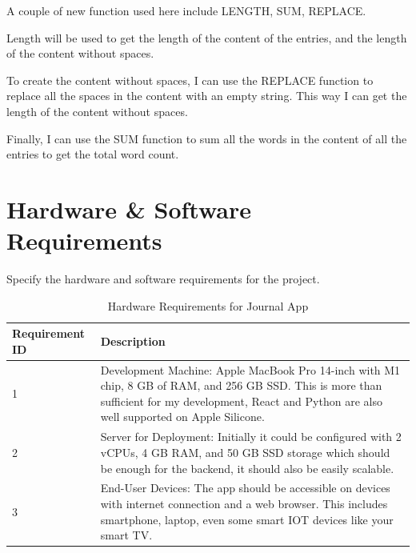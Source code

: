 A couple of new function used here include LENGTH, SUM, REPLACE.

Length will be used to get the length of the content of the entries, and the length of the content without spaces.

To create the content without spaces, I can use the REPLACE function to replace all the spaces in the content with an empty string. This way I can get the length of the content without spaces.

Finally, I can use the SUM function to sum all the words in the content of all the entries to get the total word count.








\section{Hardware \& Software Requirements}
Specify the hardware and software requirements for the project.

\begin{table}[H]
    \centering
    \begin{tabular}{|l|p{10cm}|}
    \hline
    \textbf{Requirement ID} & \textbf{Description} \\ \hline
    1 & Development Machine: Apple MacBook Pro 14-inch with M1 chip, 8 GB of RAM, and 256 GB SSD. This is more than sufficient for my development, React and Python are also well supported on Apple Silicone. \\ \hline
    2 & Server for Deployment: Initially it could be configured with 2 vCPUs, 4 GB RAM, and 50 GB SSD storage which should be enough for the backend, it should also be easily scalable. \\ \hline
    3 & End-User Devices: The app should be accessible on devices with internet connection and a web browser. This includes smartphone, laptop, even some smart IOT devices like your smart TV. \\ \hline
    \end{tabular}
    \caption{Hardware Requirements for Journal App}
    \end{table}

